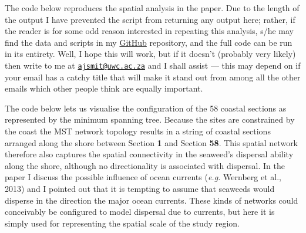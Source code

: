 \documentclass[10pt,A4,]{article}
\newenvironment{Shaded}{\begin{snugshade}}{\end{snugshade}}
\newcommand{\KeywordTok}[1]{\textcolor[rgb]{0.13,0.29,0.53}{\textbf{#1}}}
\newcommand{\DataTypeTok}[1]{\textcolor[rgb]{0.13,0.29,0.53}{#1}}
\newcommand{\StringTok}[1]{\textcolor[rgb]{0.31,0.60,0.02}{#1}}
\newcommand{\CommentTok}[1]{\textcolor[rgb]{0.56,0.35,0.01}{\textit{#1}}}
\newcommand{\OtherTok}[1]{\textcolor[rgb]{0.56,0.35,0.01}{#1}}
\newcommand{\OperatorTok}[1]{\textcolor[rgb]{0.81,0.36,0.00}{\textbf{#1}}}
\newcommand{\NormalTok}[1]{#1}
\begin{document}
The code below reproduces the spatial analysis in the paper. Due to the
length of the output I have prevented the script from returning any
output here; rather, if the reader is for some odd reason interested in
repeating this analysis, s/he may find the data and scripts in my
\href{https://github.com/ajsmit/Seaweed-beta}{GitHub} repository, and
the full code can be run in its entirety. Well, I hope this will work,
but if it doesn't (probably very likely) then write to me at
\href{mailto:ajsmit@uwc.ac.za}{\nolinkurl{ajsmit@uwc.ac.za}} and I shall
assist --- this may depend on if your email has a catchy title that will
make it stand out from among all the other emails which other people
think are equally important.

\begin{Shaded}
\end{Shaded}

The code below lets us visualise the configuration of the 58 coastal
sections as represented by the minimum spanning tree. Because the sites
are constrained by the coast the MST network topology results in a
string of coastal sections arranged along the shore between Section
\textbf{1} and Section \textbf{58}. This spatial network therefore also
captures the spatial connectivity in the seaweed's dispersal ability
along the shore, although no directionality is associated with
dispersal. In the paper I discuss the possible influence of ocean
currents (\emph{e.g.} Wernberg et al., 2013) and I pointed out that it
is tempting to assume that seaweeds would disperse in the direction the
major ocean currents. These kinds of networks could conceivably be
configured to model dispersal due to currents, but here it is simply
used for representing the spatial scale of the study region.
\end{document}
